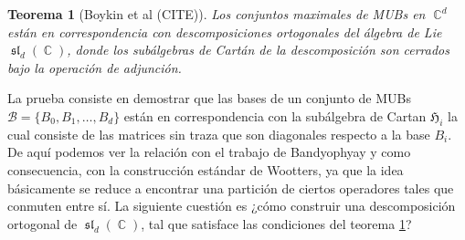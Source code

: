 \documentclass[a4paper]{report}
\DeclareMathOperator{\C}{\mathbb{C}}
\DeclareMathOperator{\Sl}{\mathfrak{sl}}
\newtheorem{theorem}{Teorema}
\begin{document}
  \begin{theorem}[Boykin et al (CITE)]
    \label{thm:boykin}
    Los conjuntos maximales de MUBs en $\C^{d}$ están en
    correspondencia con descomposiciones ortogonales del
    álgebra de Lie $\Sl_d(\C)$, donde los subálgebras de
    Cartán de la descomposición son cerrados bajo la
    operación de adjunción.
  \end{theorem}
  La prueba consiste en demostrar que las bases de un
  conjunto de MUBs $\mathcal B = \{B_0,B_1,\ldots,B_d\}$ 
  están en correspondencia con la subálgebra de Cartan
  $\mathfrak{H}_i$ la cual consiste de las matrices sin
  traza que son diagonales respecto a la base $B_i$. De aquí
  podemos ver la relación con el trabajo de Bandyophyay y
  como consecuencia, con la construcción estándar de
  Wootters, ya que la idea básicamente se reduce a encontrar
  una partición de ciertos operadores tales que conmuten
  entre sí. La siguiente cuestión es ¿cómo construir una
  descomposición ortogonal de $\Sl_d(\C)$, tal que satisface
  las condiciones del teorema \ref{thm:boykin}? 
\end{document}
